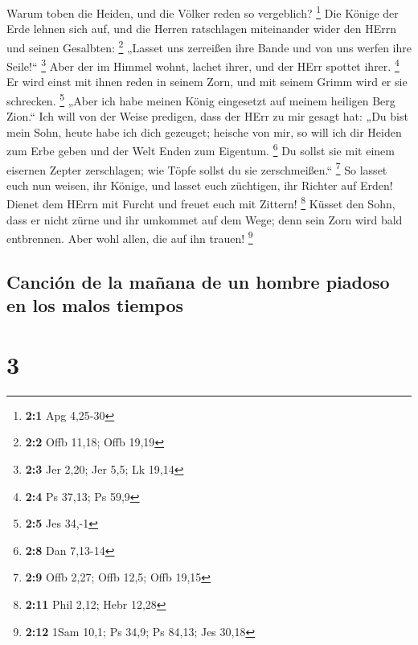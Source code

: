  Warum toben die Heiden, und die Völker reden so
vergeblich? \footnote{\textbf{2:1} Apg 4,25-30}  Die
Könige der Erde lehnen sich auf, und die Herren ratschlagen miteinander
wider den HErrn und seinen Gesalbten: \footnote{\textbf{2:2} Offb 11,18;
  Offb 19,19}  „Lasset uns zerreißen ihre Bande und von
uns werfen ihre Seile!{}`` \footnote{\textbf{2:3} Jer 2,20; Jer 5,5; Lk
  19,14}  Aber der im Himmel wohnt, lachet ihrer, und der
HErr spottet ihrer. \footnote{\textbf{2:4} Ps 37,13; Ps 59,9}
 Er wird einst mit ihnen reden in seinem Zorn, und mit
seinem Grimm wird er sie schrecken. \footnote{\textbf{2:5} Jes 34,-1}
 „Aber ich habe meinen König eingesetzt auf meinem
heiligen Berg Zion.``  Ich will von der Weise predigen,
dass der HErr zu mir gesagt hat: „Du bist mein Sohn, heute habe ich dich
gezeuget;  heische von mir, so will ich dir Heiden zum
Erbe geben und der Welt Enden zum Eigentum. \footnote{\textbf{2:8} Dan
  7,13-14}  Du sollst sie mit einem eisernen Zepter
zerschlagen; wie Töpfe sollst du sie zerschmeißen.`` \footnote{\textbf{2:9}
  Offb 2,27; Offb 12,5; Offb 19,15}  So lasset euch nun
weisen, ihr Könige, und lasset euch züchtigen, ihr Richter auf Erden!
 Dienet dem HErrn mit Furcht und freuet euch mit Zittern!
\footnote{\textbf{2:11} Phil 2,12; Hebr 12,28}  Küsset
den Sohn, dass er nicht zürne und ihr umkommet auf dem Wege; denn sein
Zorn wird bald entbrennen. Aber wohl allen, die auf ihn trauen!
\footnote{\textbf{2:12} 1Sam 10,1; Ps 34,9; Ps 84,13; Jes 30,18}

\hypertarget{canciuxf3n-de-la-mauxf1ana-de-un-hombre-piadoso-en-los-malos-tiempos}{%
\subsection{Canción de la mañana de un hombre piadoso en los malos
tiempos}\label{canciuxf3n-de-la-mauxf1ana-de-un-hombre-piadoso-en-los-malos-tiempos}}

\hypertarget{section-2}{%
\section{3}\label{section-2}}

